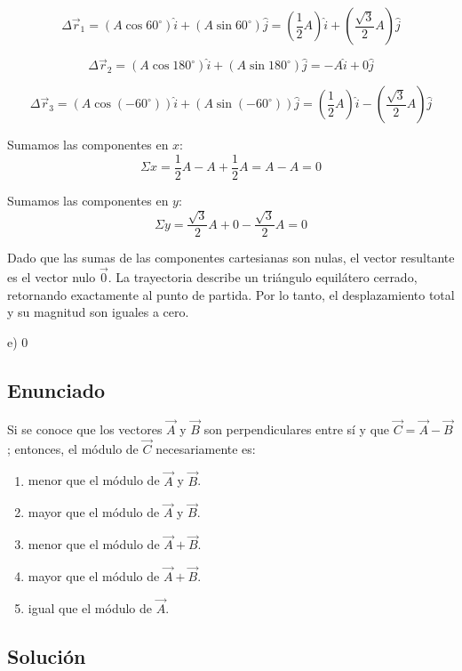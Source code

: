 \documentclass[12pt, a4paper]{article}
\begin{document}
$$ \Delta\vec{r}_1 = (A \cos 60^\circ) \hat{i} + (A \sin 60^\circ) \hat{j} = \left( \frac{1}{2} A \right) \hat{i} + \left( \frac{\sqrt{3}}{2} A \right) \hat{j} $$

$$ \Delta\vec{r}_2 = (A \cos 180^\circ) \hat{i} + (A \sin 180^\circ) \hat{j} = -A \hat{i} + 0 \hat{j} $$

$$ \Delta\vec{r}_3 = (A \cos(-60^\circ)) \hat{i} + (A \sin(-60^\circ)) \hat{j} = \left( \frac{1}{2} A \right) \hat{i} - \left( \frac{\sqrt{3}}{2} A \right) \hat{j} $$

Sumamos las componentes en $x$:
$$ \Sigma x = \frac{1}{2} A - A + \frac{1}{2} A = A - A = 0 $$

Sumamos las componentes en $y$:
$$ \Sigma y = \frac{\sqrt{3}}{2} A + 0 - \frac{\sqrt{3}}{2} A = 0 $$

Dado que las sumas de las componentes cartesianas son nulas, el vector resultante es el vector nulo $\vec{0}$. La trayectoria describe un triángulo equilátero cerrado, retornando exactamente al punto de partida. Por lo tanto, el desplazamiento total y su magnitud son iguales a cero.

\begin{tcolorbox}[colback=green!5!white, colframe=green!50!black, title=Respuesta Final]
\centering \Large e) $0$
\end{tcolorbox}

\newpage

\subsection*{Enunciado}
Si se conoce que los vectores $\vec{A}$ y $\vec{B}$ son perpendiculares entre sí y que $\vec{C} = \vec{A} - \vec{B}$; entonces, el módulo de $\vec{C}$ necesariamente es:

\begin{enumerate}[label=\alph*)]
    \item menor que el módulo de $\vec{A}$ y $\vec{B}$.
    \item mayor que el módulo de $\vec{A}$ y $\vec{B}$.
    \item menor que el módulo de $\vec{A} + \vec{B}$.
    \item mayor que el módulo de $\vec{A} + \vec{B}$.
    \item igual que el módulo de $\vec{A}$.
\end{enumerate}

\subsection*{Solución}
\end{document}

